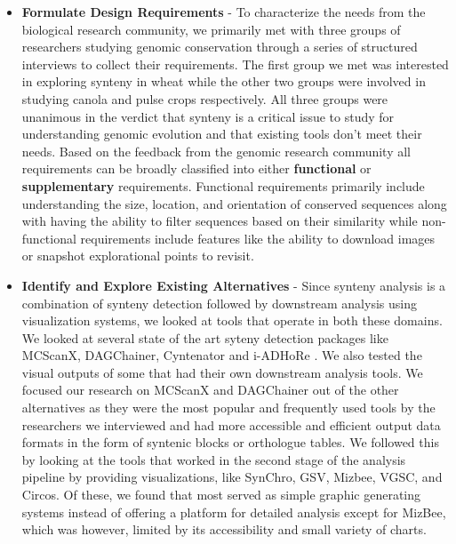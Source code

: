 \begin{itemize}
    
    \item \textbf{Formulate Design Requirements} -
    To characterize the needs from the biological research community, we primarily met with three groups of researchers studying genomic conservation through a series of structured interviews to collect their requirements. The first group we met was interested in exploring synteny in wheat while the other two groups were involved in studying canola and pulse crops respectively. All three groups were unanimous in the verdict that synteny is a critical issue to study for understanding genomic evolution and that existing tools don't meet their needs. Based on the feedback from the genomic research community all requirements can be broadly classified into either \textbf{functional} or \textbf{supplementary} requirements. Functional requirements primarily include understanding the size, location, and orientation of conserved sequences along with having the ability to filter sequences based on their similarity while non-functional requirements include features like the ability to download images or snapshot explorational points to revisit.
    
    \item \textbf{Identify and Explore Existing Alternatives} - 
    Since synteny analysis is a combination of synteny detection followed by downstream analysis using visualization systems, we looked at tools that operate in both these domains. We looked at several state of the art syteny detection packages like MCScanX, DAGChainer, Cyntenator and i-ADHoRe \cite{wang2012mcscanx,haas2004dagchainer,rodelsperger2010cyntenator,proost2011adhore}. We also tested the visual outputs of some that had their own downstream analysis tools. We focused our research on MCScanX and DAGChainer out of the other alternatives as they were the most popular and frequently used tools by the researchers we interviewed and had more accessible and  efficient output data formats in the form of syntenic blocks or orthologue tables. We followed this by looking at the tools that worked in the second stage of the analysis pipeline by providing visualizations, like SynChro, GSV, Mizbee, VGSC, and Circos\cite{drillon2014synchro,revanna2011gsv,Meyer2009,xu2016vgsc}. Of these, we found that most served as simple graphic generating systems instead of offering a platform for detailed analysis except for MizBee, which was however, limited by its accessibility and small variety of charts.


\end{itemize}
